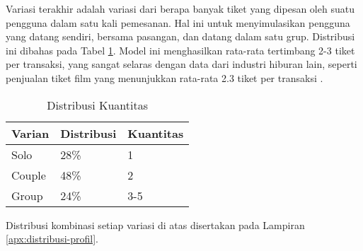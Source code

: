 Variasi terakhir adalah variasi dari berapa banyak tiket yang dipesan oleh suatu pengguna dalam satu kali pemesanan. Hal ini untuk menyimulasikan pengguna yang datang sendiri, bersama pasangan, dan datang dalam satu grup. Distribusi ini dibahas pada Tabel \ref{table:distribusi-kuantitas}. Model ini menghasilkan rata-rata tertimbang 2-3 tiket per transaksi, yang sangat selaras dengan data dari industri hiburan lain, seperti penjualan tiket film yang menunjukkan rata-rata 2.3 tiket per transaksi \parencite{vista2025}.

\begin{table}[H]
    \centering
    \caption{Distribusi Kuantitas}
    \label{table:distribusi-kuantitas}
    \begin{tabular}{|l|l|l|}
        \hline
        \textbf{Varian} & \textbf{Distribusi} & \textbf{Kuantitas} \\
        \hline
        Solo            & 28\%                & 1                  \\
        \hline
        Couple          & 48\%                & 2                  \\
        \hline
        Group           & 24\%                & 3-5                \\
        \hline
    \end{tabular}
\end{table}

Distribusi kombinasi setiap variasi di atas disertakan pada Lampiran \ref{apx:distribusi-profil}.